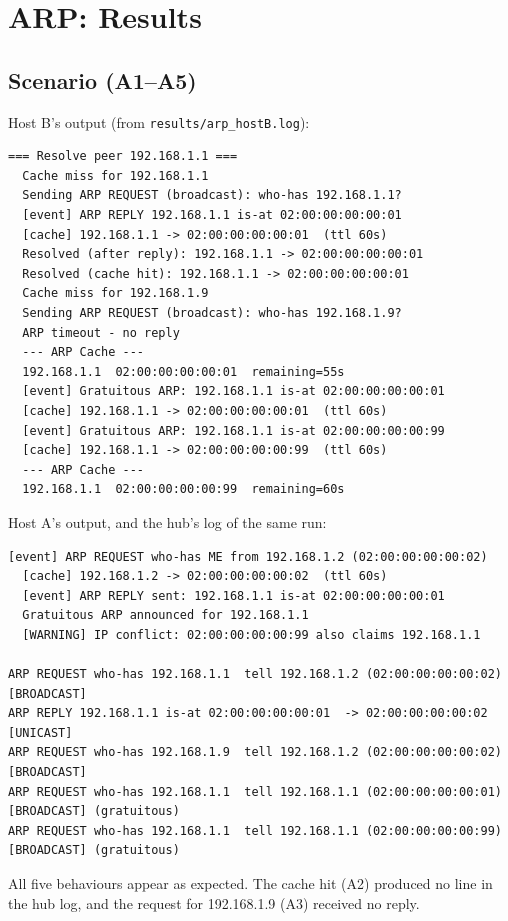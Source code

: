 \documentclass[11pt]{article}
\begin{document}
\section{ARP: Results}

\subsection{Scenario (A1--A5)}
Host B's output (from \texttt{results/arp\_hostB.log}):
\begin{lstlisting}[style=log]
=== Resolve peer 192.168.1.1 ===
  Cache miss for 192.168.1.1
  Sending ARP REQUEST (broadcast): who-has 192.168.1.1?
  [event] ARP REPLY 192.168.1.1 is-at 02:00:00:00:00:01
  [cache] 192.168.1.1 -> 02:00:00:00:00:01  (ttl 60s)
  Resolved (after reply): 192.168.1.1 -> 02:00:00:00:00:01
  Resolved (cache hit): 192.168.1.1 -> 02:00:00:00:00:01
  Cache miss for 192.168.1.9
  Sending ARP REQUEST (broadcast): who-has 192.168.1.9?
  ARP timeout - no reply
  --- ARP Cache ---
  192.168.1.1  02:00:00:00:00:01  remaining=55s
  [event] Gratuitous ARP: 192.168.1.1 is-at 02:00:00:00:00:01
  [cache] 192.168.1.1 -> 02:00:00:00:00:01  (ttl 60s)
  [event] Gratuitous ARP: 192.168.1.1 is-at 02:00:00:00:00:99
  [cache] 192.168.1.1 -> 02:00:00:00:00:99  (ttl 60s)
  --- ARP Cache ---
  192.168.1.1  02:00:00:00:00:99  remaining=60s
\end{lstlisting}
Host A's output, and the hub's log of the same run:
\begin{lstlisting}[style=log]
  [event] ARP REQUEST who-has ME from 192.168.1.2 (02:00:00:00:00:02)
  [cache] 192.168.1.2 -> 02:00:00:00:00:02  (ttl 60s)
  [event] ARP REPLY sent: 192.168.1.1 is-at 02:00:00:00:00:01
  Gratuitous ARP announced for 192.168.1.1
  [WARNING] IP conflict: 02:00:00:00:00:99 also claims 192.168.1.1

ARP REQUEST who-has 192.168.1.1  tell 192.168.1.2 (02:00:00:00:00:02)  [BROADCAST]
ARP REPLY 192.168.1.1 is-at 02:00:00:00:00:01  -> 02:00:00:00:00:02  [UNICAST]
ARP REQUEST who-has 192.168.1.9  tell 192.168.1.2 (02:00:00:00:00:02)  [BROADCAST]
ARP REQUEST who-has 192.168.1.1  tell 192.168.1.1 (02:00:00:00:00:01)  [BROADCAST] (gratuitous)
ARP REQUEST who-has 192.168.1.1  tell 192.168.1.1 (02:00:00:00:00:99)  [BROADCAST] (gratuitous)
\end{lstlisting}
All five behaviours appear as expected. The cache hit (A2) produced no line in the hub
log, and the request for 192.168.1.9 (A3) received no reply.
\end{document}
